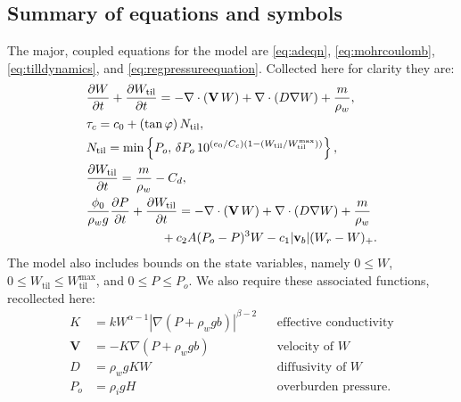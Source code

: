 \documentclass[gmd]{copernicus}   %
\newcommand{\text}{\textrm}
\newcommand\bv{\mathbf{v}}
\newcommand\bV{\mathbf{V}}
\newcommand{\ddt}[1]{\ensuremath{\frac{\partial #1}{\partial t}}}
\newcommand{\Div}{\nabla\cdot}
\newcommand{\grad}{\nabla}
\newcommand{\Wtil}{W_{\text{til}}}
\newcommand{\Wtilmax}{W_{\text{til}}^{\text{max}}}
\begin{document}
\subsection{Summary of equations and symbols}  The major, coupled equations for the model are \eqref{eq:adeqn}, \eqref{eq:mohrcoulomb}, \eqref{eq:tilldynamics}, and \eqref{eq:regpressureequation}.  Collected here for clarity they are:
\begin{align}
&\ddt{W} + \ddt{\Wtil} = - \Div\left(\bV\, W\right) + \Div \left(D \grad W\right) + \frac{m}{\rho_w}, \label{eq:bluebox} \\
&\tau_c = c_0 + (\tan \varphi)\, \Ntil, \notag \\
&\Ntil = \min\left\{P_o,\, \delta P_o \, 10^{(e_0/C_c) \left(1 - (\Wtil/\Wtilmax)\right)}\right\}, \notag \\
&\frac{\partial \Wtil}{\partial t} = \frac{m}{\rho_w} - C_d, \notag \\
&\frac{\phi_0}{\rho_w g} \ddt{P} + \ddt{\Wtil} = - \Div\left(\bV\, W\right) + \Div \left(D \grad W\right) + \frac{m}{\rho_w} \notag \\
& \qquad \qquad \qquad + c_2 A (P_o - P)^3 W - c_1 |\bv_b| (W_r - W)_+. \notag
\end{align}
The model also includes bounds on the state variables, namely $0\le W$, $0\le \Wtil \le \Wtilmax$, and $0 \le P \le P_o$.  We also require these associated functions, recollected here:
\begin{align*}
K    &= k W^{\alpha-1} \left|\grad(P+\rho_w g b)\right|^{\beta-2} && \text{effective conductivity} \\
\bV  &= - K \grad\left(P + \rho_w g b\right) && \text{velocity of $W$} \\
D    &= \rho_w g K W && \text{diffusivity of $W$} \\
P_o  &= \rho_i g H && \text{overburden pressure}.
\end{align*}
\end{document}
